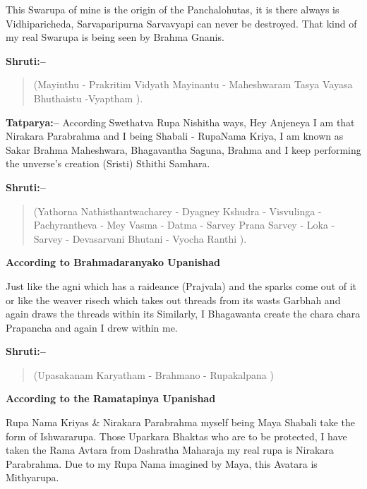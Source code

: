 This Swarupa of mine is the origin of the Panchalohutas, it is there always is Vidhiparicheda, Sarvaparipurna Sarvavyapi can never be destroyed. That kind of my real Swarupa is being seen by Brahma Gnanis.

\textbf{Shruti:–}

\begin{verse}
(Mayinthu - Prakritim Vidyath Mayinantu - Mahe\break shwaram  Tasya Vayasa Bhuthaistu -Vyaptham ).
\end{verse}

\textbf{Tatparya:–} According Swethatva Rupa Nishitha ways, Hey Anjeneya I am that Nirakara Parabrahma and I being Shabali - RupaNama Kriya, I am known as Sakar Brahma Maheshwara, Bhagavantha Saguna, Brahma and I keep performing the unverse's creation (Sristi) Sthithi Samhara.

\textbf{Shruti:–}

\begin{verse}
(Yathorna Nathisthantwacharey - Dyagney Kshudra - Visvulinga - Pachyrantheva - Mey Vasma - Datma - Sarvey Prana Sarvey - Loka - Sarvey - Devasarvani Bhutani - Vyocha Ranthi ).
\end{verse}

\begin{flushright}
\textbf{According to Brahmadaranyako Upanishad}
\end{flushright}

Just like the agni which has a raideance (Prajvala) and the sparks come out of it or like the weaver risech which takes out threads from its wasts Garbhah and again draws the threads within its Similarly, I Bhagawanta create the chara chara Prapancha and again I drew within me.

\textbf{Shruti:–}

\begin{verse}
(Upasakanam Karyatham - Brahmano - Rupakalpana )
\end{verse}

\begin{flushright}
\textbf{According to the Ramatapinya Upanishad}
\end{flushright}

Rupa Nama Kriyas \& Nirakara Parabrahma myself being Maya Shabali take the form of Ishwararupa. Those Uparkara Bhaktas who are to be protected, I have taken the Rama Avtara from Dashratha Maharaja my real rupa is Nirakara Parabrahma. Due to my Rupa Nama imagined by Maya, this Avatara is Mithyarupa.

